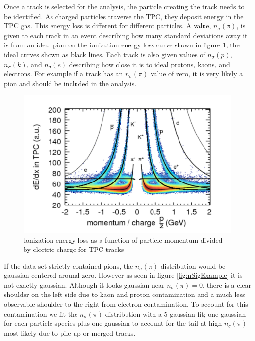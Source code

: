 \documentclass[abstract = on,listof=totoc, bibliography=totoc]{scrreprt}
\begin{document}
Once a track is selected for the analysis, the particle creating the track needs to be identified. As charged particles traverse the TPC, they deposit energy in the TPC gas. This energy loss is different for different particles. A value, $n_\sigma(\pi)$, is given to each track in an event describing how many standard deviations away it is from an ideal pion on the ionization energy loss curve shown in figure \ref{fig:tpcDedx2}; the ideal curves shown as black lines. Each track is also given values of $n_\sigma(p)$, $n_\sigma(k)$, and $n_\sigma(e)$ describing how close it is to ideal protons, kaons, and electrons. For example if a track has an $n_\sigma(\pi)$ value of zero, it is very likely a pion and should be included in the analysis. 

 \begin{figure}
\begin{center}
\includegraphics[width = .8\textwidth]{TPC_dedx2}
\caption[Ionization energy loss in TPC]{Ionization energy loss as a function of particle momentum divided by electric charge for TPC tracks}
\label{fig:tpcDedx2}
\end{center}
\end{figure}


If the data set strictly contained pions, the $n_\sigma(\pi)$ distribution would be gaussian centered around zero. However as seen in figure \ref{fig:nSigExample} it is not exactly gaussian. Although it looks gaussian near $n_\sigma(\pi) = 0$, there is a clear shoulder on the left side due to kaon and proton contamination and a much less observable shoulder to the right from electron contamination. To account for this contamination we fit the $n_\sigma(\pi)$ distribution with a 5-gaussian fit; one gaussian for each particle species plus one gaussian to account for the tail at high $n_\sigma(\pi)$ most likely due to pile up or merged tracks. 
\end{document}
